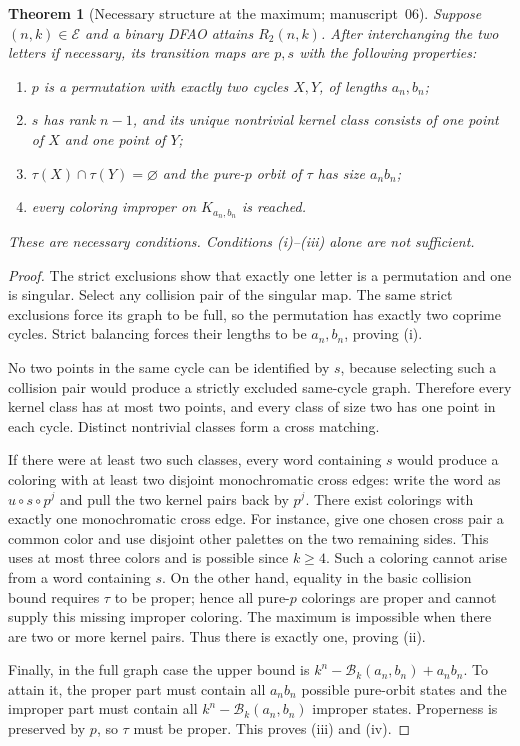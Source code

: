 \documentclass[11pt,a4paper]{article}
\numberwithin{equation}{section}
\newtheorem{theorem}{Theorem}[section]
\theoremstyle{definition}
\theoremstyle{remark}
\newcommand{\Bip}{\mathcal B}
\begin{document}
\begin{theorem}[Necessary structure at the maximum; manuscript~06]\label{evo:thm:rigidity}
Suppose $(n,k)\in\mathcal E$ and a binary DFAO attains $R_2(n,k)$. After
interchanging the two letters if necessary, its transition maps are $p,s$ with
the following properties:
\begin{enumerate}[label=(\roman*)]
\item $p$ is a permutation with exactly two cycles $X,Y$, of lengths
$a_n,b_n$;
\item $s$ has rank $n-1$, and its unique nontrivial kernel class consists of
one point of $X$ and one point of $Y$;
\item $\tau(X)\cap\tau(Y)=\varnothing$ and the pure-$p$ orbit of $\tau$ has
size $a_nb_n$;
\item every coloring improper on $K_{a_n,b_n}$ is reached.
\end{enumerate}
These are necessary conditions. Conditions (i)--(iii) alone are not
sufficient.
\end{theorem}
\begin{proof}
The strict exclusions show that exactly one letter is a permutation and one
is singular. Select any collision pair of the singular map. The same strict
exclusions force its graph to be full, so the permutation has exactly two
coprime cycles. Strict balancing forces their lengths to be $a_n,b_n$,
proving (i).

No two points in the same cycle can be identified by $s$, because selecting
such a collision pair would produce a strictly excluded same-cycle graph.
Therefore every kernel class has at most two points, and every class of size
two has one point in each cycle. Distinct nontrivial classes form a cross
matching.

If there were at least two such classes, every word containing $s$ would
produce a coloring with at least two disjoint monochromatic cross edges: write
the word as $u\circ s\circ p^j$ and pull the two kernel pairs back by $p^j$.
There exist colorings with exactly one monochromatic cross edge. For instance,
give one chosen cross pair a common color and use disjoint other palettes on
the two remaining sides. This uses at most three colors and is possible since
$k\ge4$. Such a coloring cannot arise from a word containing $s$. On the other
hand, equality in the basic collision bound requires $\tau$ to be proper;
hence all pure-$p$ colorings are proper and cannot supply this missing
improper coloring. The maximum is impossible when there are two or more
kernel pairs. Thus there is exactly one, proving (ii).

Finally, in the full graph case the upper bound is
$k^n-\Bip_k(a_n,b_n)+a_nb_n$. To attain it, the proper part must contain all
$a_nb_n$ possible pure-orbit states and the improper part must contain all
$k^n-\Bip_k(a_n,b_n)$ improper states. Properness is preserved by $p$, so
$\tau$ must be proper. This proves (iii) and (iv).
\end{proof}
\end{document}
